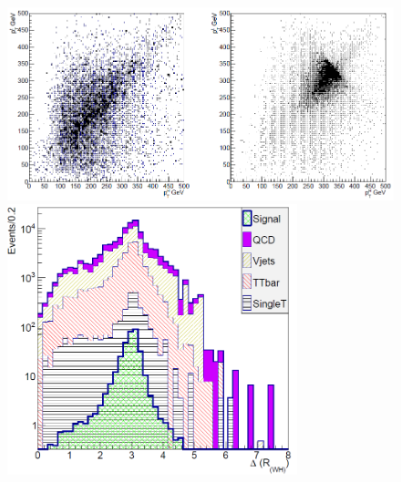 \begin{frame}{}
\begin{columns}
\begin{column}{.50\textwidth}
\begin{figure}[!Hhtbp]
\begin{center}
\includegraphics[width=1.0\textwidth]{../figs/Pheno/HPTTPT.png}\\
\includegraphics[width=0.75\textwidth]{../figs/Pheno/DRWH.png}
\end{center}
\end{figure}
\end{column}
\end{columns}

\end{frame}

